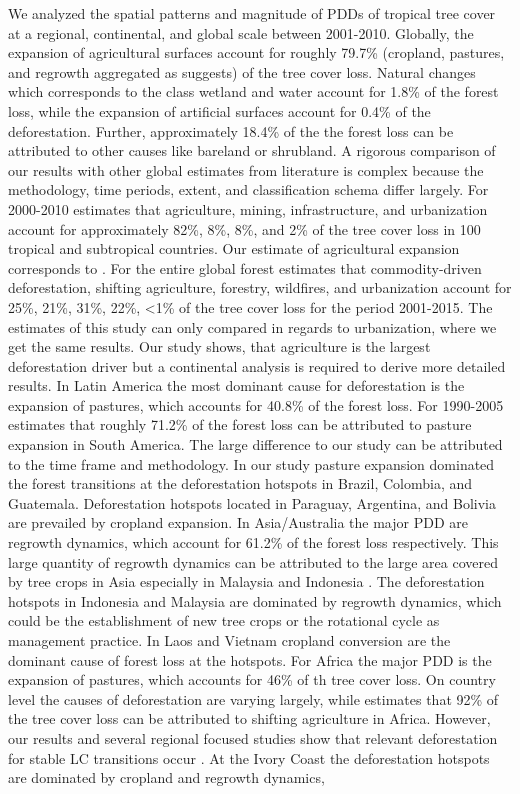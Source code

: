 		We analyzed the spatial patterns and magnitude of \acp{PDD} of tropical tree cover at a regional, continental, and global scale between 2001-2010. Globally, the expansion of agricultural surfaces account for roughly 79.7\% (cropland, pastures, and regrowth aggregated as \citet{Geist2001} suggests) of the tree cover loss. Natural changes which corresponds to the class wetland and water account for 1.8\% of the forest loss, while the expansion of artificial surfaces account for 0.4\% of the deforestation. Further, approximately 18.4\% of the the forest loss can be attributed to other causes like bareland or shrubland. A rigorous comparison of our results with other global estimates from literature is complex because the methodology, time periods, extent, and classification schema differ largely. For 2000-2010 \citet{Hosonuma2012} estimates that agriculture, mining, infrastructure, and urbanization account for approximately 82\%, 8\%, 8\%, and 2\% of the tree cover loss in 100 tropical and subtropical countries. Our estimate of agricultural expansion corresponds to \citet{Hosonuma2012}. For the entire global forest \citet{Curtis2018} estimates that commodity-driven deforestation, shifting agriculture, forestry, wildfires, and urbanization account for 25\%, 21\%, 31\%, 22\%, <1\% of the tree cover loss for the period 2001-2015. The estimates of this study can only compared in regards to urbanization, where we get the same results. Our study shows, that agriculture is the largest deforestation driver but a continental analysis is required to derive more detailed results. In Latin America the most dominant cause for deforestation is the expansion of pastures, which accounts for 40.8\% of the forest loss. For 1990-2005 \citet{Sy2015} estimates that roughly 71.2\% of the forest loss can be attributed to pasture expansion in South America. The large difference to our study can be attributed to the time frame and methodology. In our study pasture expansion dominated the forest transitions at the deforestation hotspots in Brazil, Colombia, and Guatemala. Deforestation hotspots located in Paraguay, Argentina, and Bolivia are prevailed by cropland expansion. In Asia/Australia the major \ac{PDD} are regrowth dynamics, which account for 61.2\% of the forest loss respectively. This large quantity of regrowth dynamics can be attributed to the large area covered by tree crops in Asia especially in Malaysia and Indonesia \citep{Corley2016,Austin2019}. The deforestation hotspots in Indonesia and Malaysia are dominated by regrowth dynamics, which could be the establishment of new tree crops or the rotational cycle as management practice. In Laos and Vietnam cropland conversion are the dominant cause of forest loss at the hotspots. For Africa the major \ac{PDD} is the expansion of pastures, which accounts for 46\% of th tree cover loss. On country level the causes of deforestation are varying largely, while \citet{Curtis2018} estimates that 92\% of the tree cover loss can be attributed to shifting agriculture in Africa. However, our results and several regional focused studies show that relevant deforestation for stable \ac{LC} transitions occur \citep{Ruf2014,Kideghesho2015,Barima2016,Folefack2019}. At the Ivory Coast the deforestation hotspots are dominated by cropland and regrowth dynamics, 